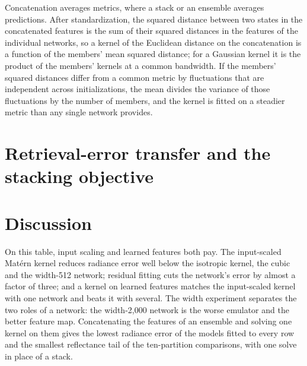 \documentclass[11pt]{article}
\newcommand{\1}{\mathbf{1}}
\begin{document}
Concatenation averages metrics, where a stack or an ensemble averages predictions. After
standardization, the squared distance between two states in the concatenated features is the sum
of their squared distances in the features of the individual networks, so a kernel of the Euclidean
distance on the concatenation is a function of the members' mean squared distance; for a Gaussian
kernel it is the product of the members' kernels at a common bandwidth. If the members' squared
distances differ from a common metric by fluctuations that are independent across initializations,
the mean divides the variance of those fluctuations by the number of members, and the kernel is
fitted on a steadier metric than any single network provides.



\section{Retrieval-error transfer and the stacking objective}\label{sec:theory}





\section{Discussion}\label{sec:discussion}

On this table, input scaling and learned features both pay. The input-scaled Mat\'ern kernel
reduces radiance error well below the isotropic kernel, the cubic and the width-512 network;
residual fitting cuts the network's error by almost a factor of three; and a kernel on learned
features matches the input-scaled kernel with one network and beats it with several. The width
experiment separates the two roles of a network: the width-2{,}000 network is the worse emulator
and the better feature map. Concatenating the features of an ensemble and solving one kernel on
them gives the lowest radiance error of the models fitted to every row and the smallest reflectance
tail of the ten-partition comparisons, with one solve in place of a stack.
\end{document}
